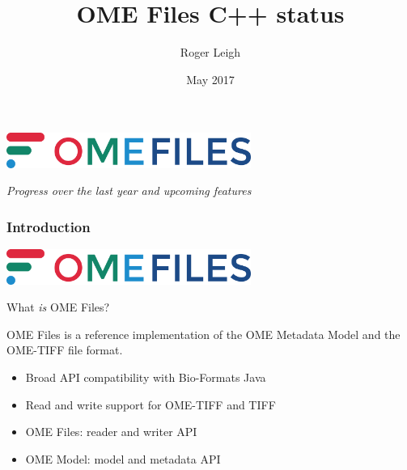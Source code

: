 \documentclass{beamer}
\title{OME Files C++ status}
\author{Roger Leigh}
\date{May 2017}
\begin{document}
\begin{frame}
  \centering
  \includegraphics[width=0.6\textwidth]{figures/ome-files}
  \titlepage

  \begin{center}
    \textsl{Progress over the last year and upcoming features}
  \end{center}
\end{frame}

\begin{frame}
  \frametitle{Introduction}
  \begin{center}
    \includegraphics[width=0.6\textwidth]{figures/ome-files}
  \end{center}
  \bigskip

  What \emph{is} OME Files?
  \bigskip

  OME Files is a reference implementation of the OME Metadata Model
  and the OME-TIFF file format.

  \begin{itemize}
  \item Broad API compatibility with Bio-Formats Java
  \item Read and write support for OME-TIFF and TIFF
  \item OME Files: reader and writer API
  \item OME Model: model and metadata API
  \end{itemize}
  
\end{frame}
\end{document}
